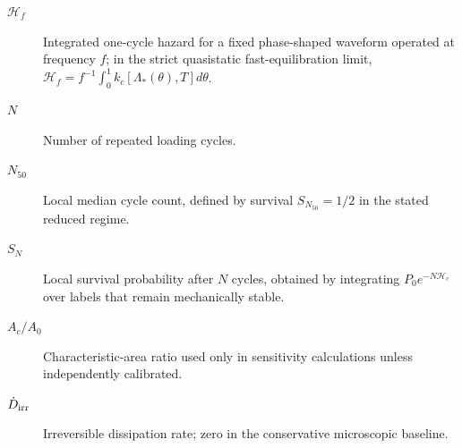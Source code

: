 \begin{description}
\item[$\mathcal H_f$] Integrated one-cycle hazard for a fixed phase-shaped waveform operated at frequency $f$; in the strict quasistatic fast-equilibration limit, $\mathcal H_f=f^{-1}\int_0^1 k_c[\Lambda_*(\theta),T]d\theta$.
\item[$N$] Number of repeated loading cycles.
\item[$N_{50}$] Local median cycle count, defined by survival $S_{N_{50}}=1/2$ in the stated reduced regime.
\item[$S_N$] Local survival probability after $N$ cycles, obtained by integrating $P_0e^{-N\mathcal H_c}$ over labels that remain mechanically stable.
\item[$A_c/A_0$] Characteristic-area ratio used only in sensitivity calculations unless independently calibrated.
\item[$\dot D_{\rm irr}$] Irreversible dissipation rate; zero in the conservative microscopic baseline.
\end{description}
